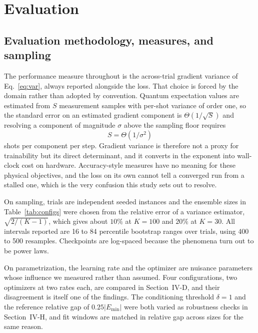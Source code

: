\documentclass[conference]{IEEEtran}%
\begin{document}
\section{Evaluation}
\subsection{Evaluation methodology, measures, and sampling}
The performance measure throughout is the across-trial gradient variance of Eq.~\eqref{eq:var}, always reported alongside the loss. That choice is forced by the domain rather than adopted by convention. Quantum expectation values are estimated from $S$ measurement samples with per-shot variance of order one, so the standard error on an estimated gradient component is $\Theta(1/\sqrt S)$ and resolving a component of magnitude $\sigma$ above the sampling floor requires
\begin{equation}
S=\Theta(1/\sigma^{2})
\label{eq:shots}
\end{equation}
shots per component per step. Gradient variance is therefore not a proxy for trainability but its direct determinant, and it converts in the exponent into wall-clock cost on hardware. Accuracy-style measures have no meaning for these physical objectives, and the loss on its own cannot tell a converged run from a stalled one, which is the very confusion this study sets out to resolve.

On sampling, trials are independent seeded instances and the ensemble sizes in Table~\ref{tab:configs} were chosen from the relative error of a variance estimator, $\sqrt{2/(K-1)}$, which gives about $10\%$ at $K{=}100$ and $20\%$ at $K{=}30$. All intervals reported are 16 to 84 percentile bootstrap ranges over trials, using 400 to 500 resamples. Checkpoints are log-spaced because the phenomena turn out to be power laws.

On parametrization, the learning rate and the optimizer are nuisance parameters whose influence we measured rather than assumed. Four configurations, two optimizers at two rates each, are compared in Section~IV-D, and their disagreement is itself one of the findings. The conditioning threshold $\delta{=}1$ and the reference relative gap of $0.25\lvert E_{\min}\rvert$ were both varied as robustness checks in Section~IV-H, and fit windows are matched in relative gap across sizes for the same reason.
\end{document}
